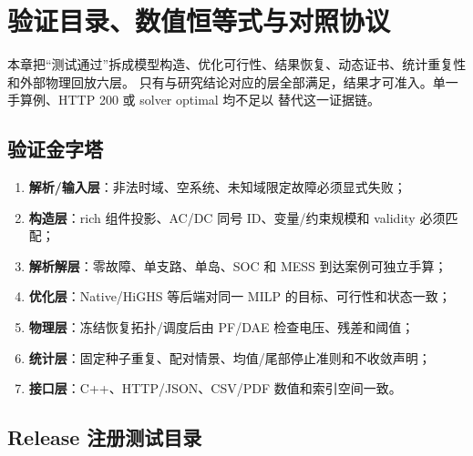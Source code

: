 \section{验证目录、数值恒等式与对照协议}\label{sec:res-verification-catalog}

本章把“测试通过”拆成模型构造、优化可行性、结果恢复、动态证书、统计重复性和外部物理回放六层。
只有与研究结论对应的层全部满足，结果才可准入。单一手算例、HTTP 200 或 solver optimal 均不足以
替代这一证据链。

\subsection{验证金字塔}

\begin{enumerate}
 \item \textbf{解析/输入层}：非法时域、空系统、未知域限定故障必须显式失败；
 \item \textbf{构造层}：rich 组件投影、AC/DC 同号 ID、变量/约束规模和 validity 必须匹配；
 \item \textbf{解析解层}：零故障、单支路、单岛、SOC 和 MESS 到达案例可独立手算；
 \item \textbf{优化层}：Native/HiGHS 等后端对同一 MILP 的目标、可行性和状态一致；
 \item \textbf{物理层}：冻结恢复拓扑/调度后由 PF/DAE 检查电压、残差和阈值；
 \item \textbf{统计层}：固定种子重复、配对情景、均值/尾部停止准则和不收敛声明；
 \item \textbf{接口层}：C++、HTTP/JSON、CSV/PDF 数值和索引空间一致。
\end{enumerate}

\subsection{Release 注册测试目录}

